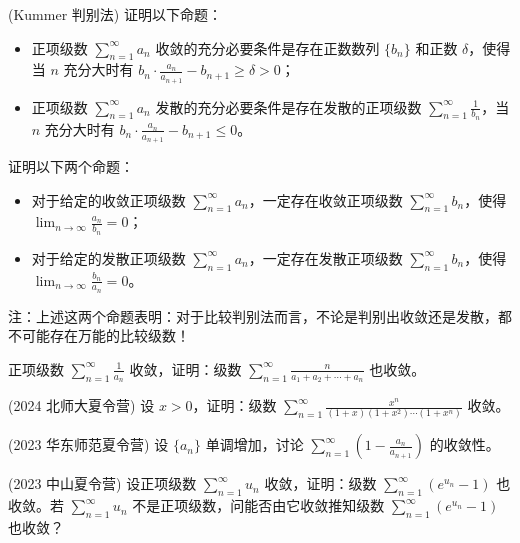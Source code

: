 \documentclass[lang=cn,10pt,thmcnt=section]{elegantbook}
\begin{document}
	\begin{example}
	(Kummer 判别法) 证明以下命题：
	\begin{itemize}
		\item 正项级数 $\sum_{n=1}^{\infty} a_n$ 收敛的充分必要条件是存在正数数列 $\{b_n\}$ 和正数 $\delta$，使得当 $n$ 充分大时有 $b_n \cdot \frac{a_n}{a_{n+1}} - b_{n+1} \geq \delta > 0$；
		\item 正项级数 $\sum_{n=1}^{\infty} a_n$ 发散的充分必要条件是存在发散的正项级数 $\sum_{n=1}^{\infty} \frac{1}{b_n}$，当 $n$ 充分大时有 $b_n \cdot \frac{a_n}{a_{n+1}} - b_{n+1} \leq 0$。
	\end{itemize}
	\end{example}
	
	\begin{example}
	证明以下两个命题：
	\begin{itemize}
		\item 对于给定的收敛正项级数 $\sum_{n=1}^{\infty} a_n$，一定存在收敛正项级数 $\sum_{n=1}^{\infty} b_n$，使得 $\lim_{n \to \infty} \frac{a_n}{b_n} = 0$；
		\item 对于给定的发散正项级数 $\sum_{n=1}^{\infty} a_n$，一定存在发散正项级数 $\sum_{n=1}^{\infty} b_n$，使得 $\lim_{n \to \infty} \frac{b_n}{a_n} = 0$。
	\end{itemize}
	\end{example}
	
	注：上述这两个命题表明：对于比较判别法而言，不论是判别出收敛还是发散，都不可能存在万能的比较级数！
	
	\begin{example}
	正项级数 $\sum_{n=1}^{\infty} \frac{1}{a_n}$ 收敛，证明：级数 $\sum_{n=1}^{\infty} \frac{n}{a_1 + a_2 + \cdots + a_n}$ 也收敛。
	\end{example}
	
	\begin{example}
	(2024 北师大夏令营) 设 $x > 0$，证明：级数 $\sum_{n=1}^{\infty} \frac{x^n}{(1+x)(1+x^2)\cdots(1+x^n)}$ 收敛。
	\end{example}
	
	\begin{example}
	(2023 华东师范夏令营) 设 $\{a_n\}$ 单调增加，讨论 $\sum_{n=1}^{\infty} \left(1 - \frac{a_n}{a_{n+1}}\right)$ 的收敛性。
	\end{example}
	
	\begin{example}
	(2023 中山夏令营) 设正项级数 $\sum_{n=1}^{\infty} u_n$ 收敛，证明：级数 $\sum_{n=1}^{\infty} (e^{u_n} - 1)$ 也收敛。若 $\sum_{n=1}^{\infty} u_n$ 不是正项级数，问能否由它收敛推知级数 $\sum_{n=1}^{\infty} (e^{u_n} - 1)$ 也收敛？
	\end{example}
	
\end{document}

